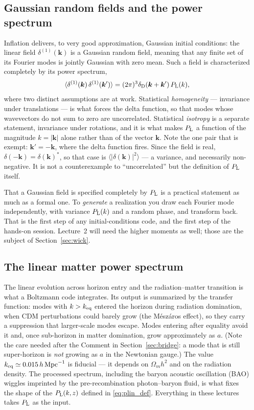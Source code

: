 \documentclass[a4paper,11pt]{article}
\newcommand{\vk}{\bm{k}}
\def\Plin{P_{\rm L}}
\def\dirac{\delta_{\rm D}}
\def\Om{\Omega_m}
\numberwithin{equation}{section}
\begin{document}
\subsection{Gaussian random fields and the power spectrum}
\label{sec:stats}

Inflation delivers, to very good approximation, Gaussian initial conditions: the linear field $\delta^{(1)}(\vk)$ is a Gaussian random field, meaning that any finite set of its Fourier modes is jointly Gaussian with zero mean. Such a field is characterized completely by its power spectrum,
\begin{equation}
\langle \delta^{(1)}(\vk)\,\delta^{(1)}(\vk')\rangle = (2\pi)^3\dirac(\vk+\vk')\,\Plin(k) ,
\label{eq:plin_def}
\end{equation}
where two distinct assumptions are at work. Statistical \emph{homogeneity} --- invariance under translations --- is what forces the delta function, so that modes whose wavevectors do not sum to zero are uncorrelated. Statistical \emph{isotropy} is a separate statement, invariance under rotations, and it is what makes $\Plin$ a function of the magnitude $k=|\vk|$ alone rather than of the vector $\vk$. Note the one pair that is exempt: $\vk' = -\vk$, where the delta function fires. Since the field is real, $\delta(-\vk) = \delta(\vk)^*$, so that case is $\langle|\delta(\vk)|^2\rangle$ --- a variance, and necessarily non-negative. It is not a counterexample to ``uncorrelated'' but the definition of $\Plin$ itself.

That a Gaussian field is specified completely by $\Plin$ is a practical statement as much as a formal one. To \emph{generate} a realization you draw each Fourier mode independently, with variance $\Plin(k)$ and a random phase, and transform back. That is the first step of any initial-conditions code, and the first step of the hands-on session. Lecture~2 will need the higher moments as well; those are the subject of Section~\ref{sec:wick}.

\subsection{The linear matter power spectrum}
\label{sec:linearpk}

The linear evolution across horizon entry and the radiation--matter transition is what a Boltzmann code integrates. Its output is summarized by the transfer function: modes with $k > k_{\rm eq}$ entered the horizon during radiation domination, when CDM perturbations could barely grow (the M\'esz\'aros effect), so they carry a suppression that larger-scale modes escape. Modes entering after equality avoid it and, once sub-horizon in matter domination, grow approximately as $a$. (Note the care needed after the Comment in Section~\ref{sec:bridge}: a mode that is still super-horizon is \emph{not} growing as $a$ in the Newtonian gauge.) The value $k_{\rm eq} \simeq 0.015\,h\,{\rm Mpc}^{-1}$ is fiducial --- it depends on $\Om h^2$ and on the radiation density. The processed spectrum, including the baryon acoustic oscillation (BAO) wiggles imprinted by the pre-recombination photon--baryon fluid, is what fixes the shape of the $\Plin(k,z)$ defined in \eqref{eq:plin_def}. Everything in these lectures takes $\Plin$ as the input.
\end{document}
